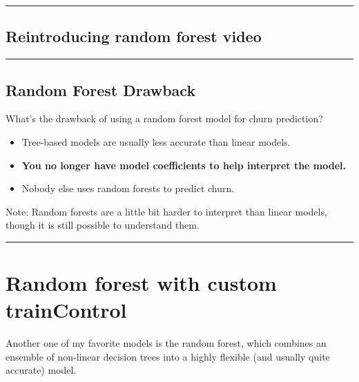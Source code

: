 \documentclass[
]{book}
\begin{document}
\begin{center}\rule{0.5\linewidth}{0.5pt}\end{center}

\hypertarget{reintroducing-random-forest-video}{%
\subsection*{Reintroducing random forest video}\label{reintroducing-random-forest-video}}

\begin{center}\rule{0.5\linewidth}{0.5pt}\end{center}

\hypertarget{random-forest-drawback}{%
\subsection*{Random Forest Drawback}\label{random-forest-drawback}}

What's the drawback of using a random forest model for churn prediction?

\begin{itemize}
\item
  Tree-based models are usually less accurate than linear models.
\item
  \textbf{You no longer have model coefficients to help interpret the model.}
\item
  Nobody else uses random forests to predict churn.
\end{itemize}

Note: Random forests are a little bit harder to interpret than linear models, though it is still possible to understand them.

\begin{center}\rule{0.5\linewidth}{0.5pt}\end{center}

\hypertarget{random-forest-with-custom-traincontrol}{%
\section{Random forest with custom trainControl}\label{random-forest-with-custom-traincontrol}}

Another one of my favorite models is the random forest, which combines an ensemble of non-linear decision trees into a highly flexible (and usually quite accurate) model.
\end{document}
